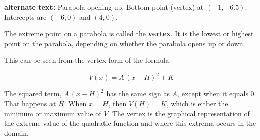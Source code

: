 \documentclass{ximera}
\begin{document}
\begin{image}
\end{image}

\textcolor{gray!90}{\textbf{alternate text:} Parabola opening up. Bottom point (vertex) at $(-1,-6.5)$. Intercepts are $(-6,0)$ and $(4,0)$.}








The extreme point on a parabola is called the \textbf{vertex}.  It is the lowest or highest point on the parabola, depending on whether the parabola opens up or down. 

This can be seen from the vertex form of the formula.




\[
V(x) = A \, (x - H)^2 + K
\]

The squared term, $A \, (x - H)^2$ has the same sign as $A$, except when it equals $0$.  That happens at $H$.  When $x = H$, then $V(H) = K$, which is either the minimum or maximum value of $V$.  The vertex is the graphical representation of the extreme value of the quadratic function and where this extrema occurs in the domain.
\end{document}
